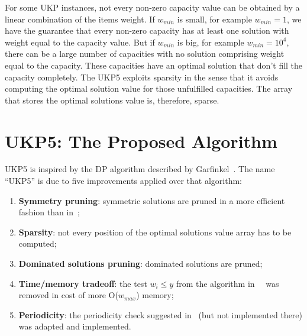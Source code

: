 \documentclass[runningheads,a4paper]{llncs}
\begin{document}

For some UKP instances, not every non-zero capacity value can be obtained by a linear combination of the items weight. 
If \(w_{min}\) is small, for example \(w_{min} = 1\), we have the guarantee that every non-zero capacity has at least one solution with weight equal to the capacity value.
But if \(w_{min}\) is big, for example \(w_{min} = 10^4\), there can be a large number of capacities with no solution comprising weight equal to the capacity. 
These capacities have an optimal solution that don't fill the capacity completely. 
The UKP5 exploits sparsity in the sense that it avoids computing the optimal solution value for those unfulfilled capacities. 
The array that stores the optimal solutions value is, therefore, sparse.

\section{UKP5: The Proposed Algorithm}
\label{sec:ukp5}

UKP5 is inspired by the DP algorithm described by Garfinkel~\cite[p. 221]{gar72}. 
The name ``UKP5'' is due to five improvements applied over that algorithm:

\begin{enumerate}
  \item \textbf{Symmetry pruning}: symmetric solutions are pruned in a more efficient fashion than in~\cite{gar72};
  \item \textbf{Sparsity}: not every position of the optimal solutions value array has to be computed;
  \item \textbf{Dominated solutions pruning}: dominated solutions are pruned;
  \item \textbf{Time/memory tradeoff}: the test \(w_i \leq y\) from the algorithm in~~\cite{gar72} was removed in cost of more O(\(w_{max}\)) memory;
  \item \textbf{Periodicity}: the periodicity check suggested in~\cite{gar72} (but not implemented there) was adapted and implemented.
\end{enumerate}
\end{document}
